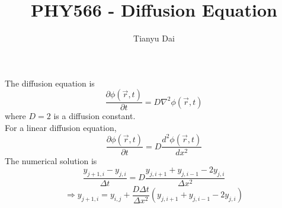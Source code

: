 \documentclass[a4paper,12pt]{article}
\title{PHY566 - Diffusion Equation}
\author{Tianyu Dai}
\begin{document}
\date{}
\maketitle
The diffusion equation is 
$$\frac{\partial\phi(\vec r, t)}{\partial t}=D\nabla^2 \phi(\vec r, t)$$
where $D=2$ is a diffusion constant. \\
For a linear diffusion equation, 
$$\frac{\partial\phi(\vec r, t)}{\partial t}=D\frac{d^2\phi(\vec r, t)}{dx^2}$$
The numerical solution is 
$$\frac{y_{j+1, i}-y_{j, i}}{\Delta t}=D\frac{y_{j, i+1}+y_{j, i-1}-2y_{j, i}}{\Delta x^2}$$
$$\Rightarrow y_{j+1, i}=y_{i, j}+\frac{D\Delta t}{\Delta x^2}(y_{j, i+1}+y_{j, i-1}-2y_{j, i})$$
\end{document}
